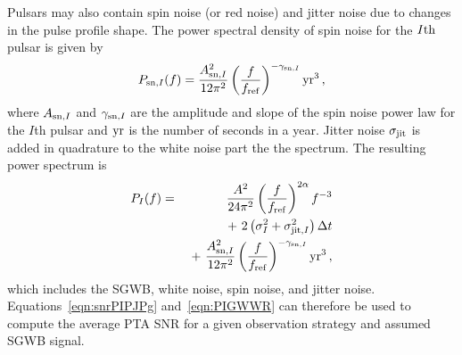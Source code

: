 Pulsars may also contain spin noise (or red noise) and jitter noise due to changes in the pulse profile shape. 
The power spectral density of spin noise for the $I{\rm th}$ pulsar is given by 
\begin{equation}
P_{{\rm sn},I} (f) = \frac{A_{{\rm sn},I}^2}{12 \pi^2} 
            \left( \frac{f}{f_{\rm ref}} \right)^{-\gamma_{{\rm sn},I}} {\rm yr}^3\,,
\end{equation}
where $A_{{\rm sn},I}$ and $\gamma_{{\rm sn},I}$ are the amplitude and slope of the spin noise power law for the $I$th pulsar and ${\rm yr}$ is the number of seconds in a year. 
Jitter noise $\sigma_{\rm jit}$ is added in quadrature to the white noise part the the spectrum.
The resulting power spectrum is
\begin{eqnarray}
P_I (f) &=& \frac{A^2}{24 \pi^2} \left(\frac{f}{f_{\rm ref}}\right)^{2\alpha} f^{-3} \nonumber\\
          & &~+~ 2 \left( \sigma_I^2 + \sigma_{{\rm jit}, I}^2 \right) \Delta t \nonumber\\
          & &~+~ \frac{A_{{\rm sn},I}^2}{12 \pi^2} 
          \left( \frac{f}{f_{\rm ref}} \right)^{-\gamma_{{\rm sn},I}} {\rm yr}^3\,,
\label{eqn:PIGWWR}
\end{eqnarray}
which includes the SGWB, white noise, spin noise, and jitter noise.
Equations~\ref{eqn:snrPIPJPg} and~\ref{eqn:PIGWWR} can therefore be used to compute the average PTA SNR for a given observation strategy and assumed SGWB signal. 

